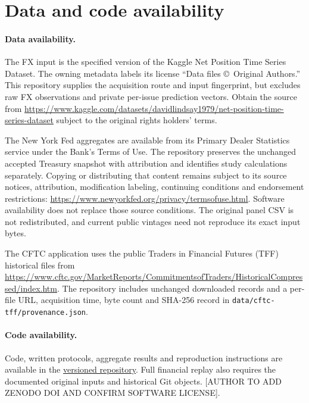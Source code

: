 \documentclass[11pt,a4paper]{article}
\begin{document}
\FloatBarrier

\section*{Data and code availability}
\paragraph{Data availability.} The FX input is the specified version of the Kaggle Net Position Time Series Dataset. The owning metadata labels its license ``Data files \copyright\ Original Authors.'' This repository supplies the acquisition route and input fingerprint, but excludes raw FX observations and private per-issue prediction vectors. Obtain the source from \url{https://www.kaggle.com/datasets/davidlindsay1979/net-position-time-series-dataset} subject to the original rights holders' terms.

The New York Fed aggregates are available from its Primary Dealer Statistics service under the Bank's Terms of Use. The repository preserves the unchanged accepted Treasury snapshot with attribution and identifies study calculations separately. Copying or distributing that content remains subject to its source notices, attribution, modification labeling, continuing conditions and endorsement restrictions: \url{https://www.newyorkfed.org/privacy/termsofuse.html}. Software availability does not replace those source conditions. The original panel CSV is not redistributed, and current public vintages need not reproduce its exact input bytes.

The CFTC application uses the public Traders in Financial Futures (TFF) historical files from \url{https://www.cftc.gov/MarketReports/CommitmentsofTraders/HistoricalCompressed/index.htm}. The repository includes unchanged downloaded records and a per-file URL, acquisition time, byte count and SHA-256 record in \texttt{data/cftc-tff/provenance.json}.

\paragraph{Code availability.} Code, written protocols, aggregate results and reproduction instructions are available in the \href{https://github.com/ByronLi0207/financial-mathematics-paper-20261020/tree/submission-final}{versioned repository}. Full financial replay also requires the documented original inputs and historical Git objects. [AUTHOR TO ADD ZENODO DOI AND CONFIRM SOFTWARE LICENSE].
\end{document}
